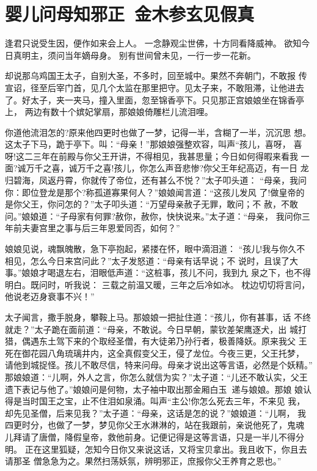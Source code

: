 \chapter{婴儿问母知邪正~金木参玄见假真}

逢君只说受生因，便作如来会上人。
一念静观尘世佛，十方同看降威神。
欲知今日真明主，须问当年嫡母身。
别有世间曾未见，一行一步一花新。

却说那乌鸡国王太子，自别大圣，不多时，回至城中。果然不奔朝门，不敢报
传宣诏，径至后宰门首，见几个太监在那里把守。见太子来，不敢阻滞，让他进去
了。好太子，夹一夹马，撞入里面，忽至锦香亭下。只见那正宫娘娘坐在锦香亭上，
两边有数十个嫔妃掌扇，那娘娘倚雕栏儿流泪哩。

你道他流泪怎的?原来他四更时也做了一梦，记得一半，含糊了一半，沉沉思
想。这太子下马，跪于亭下。叫：“母亲！”那娘娘强整欢容，叫声“孩儿，喜呀，
喜呀!这二三年在前殿与你父王开讲，不得相见，我甚思量；今日如何得暇来看我
一面?诚万千之喜，诚万千之喜!孩儿，你怎么声音悲惨?你父王年纪高迈，有一日
龙归碧海，凤返丹霄，你就传了帝位，还有甚么不悦？”太子叩头道：
“母亲，我问你：即位登龙是那个?称孤道寡果何人？”娘娘闻言道：“这孩儿发风
了!做皇帝的是你父王，你问怎的？”太子叩头道：“万望母亲赦子无罪，敢问；不
赦，不敢问。”娘娘道：“子母家有何罪?赦你，赦你，快快说来。”太子道：“母亲，
我问你三年前夫妻宫里之事与后三年恩爱同否，如何？”

娘娘见说，魂飘魄散，急下亭抱起，紧搂在怀，眼中滴泪道：
“孩儿!我与你久不相见，怎么今日来宫问此？”太子发怒道：“母亲有话早说；不
说时，且误了大事。”娘娘才喝退左右，泪眼低声道：“这桩事，孩儿不问，我到九
泉之下，也不得明白。既问时，听我说：
三载之前温又暖，三年之后冷如冰。
枕边切切将言问，他说老迈身衰事不兴！”

太子闻言，撒手脱身，攀鞍上马。那娘娘一把扯住道：“孩儿，你有甚事，话
不终就走？”太子跪在面前道：“母亲，不敢说。今日早朝，蒙钦差架鹰逐犬，出
城打猎，偶遇东土驾下来的个取经圣僧，有大徒弟乃孙行者，极善降妖。原来我父
王死在御花园八角琉璃井内，这全真假变父王，侵了龙位。今夜三更，父王托梦，
请他到城捉怪。孩儿不敢尽信，特来问母。母亲才说出这等言语，必然是个妖精。”
那娘娘道：“儿啊，外人之言，你怎么就信为实？”太子道：“儿还不敢认实，父王
遗下表记与他了。”娘娘问是何物，太子袖中取出那金厢白玉，递与娘娘。那娘
娘认得是当时国王之宝，止不住泪如泉涌。叫声“主公!你怎么死去三年，不来见
我，却先见圣僧，后来见我？”太子道：“母亲，这话是怎的说？”娘娘道：“儿啊，
我四更时分，也做了一梦，梦见你父王水淋淋的，站在我跟前，亲说他死了，鬼魂
儿拜请了唐僧，降假皇帝，救他前身。记便记得是这等言语，只是一半儿不得分明。
正在这里狐疑，怎知今日你又来说这话，又将宝贝拿出。我且收下，你且去请那圣
僧急急为之。果然扫荡妖氛，辨明邪正，庶报你父王养育之恩也。”

